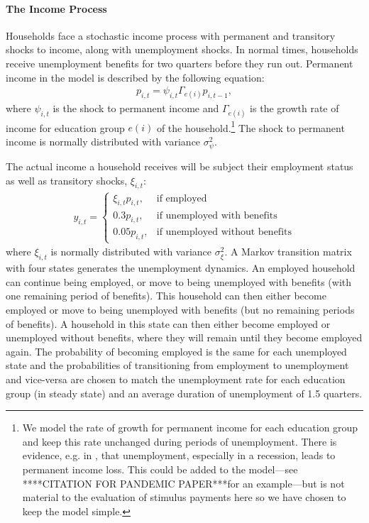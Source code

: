 \documentclass[../HAFiscal]{subfiles}
\begin{document}
\paragraph{The Income Process}
Households face a stochastic income process with permanent and transitory shocks to income, along with unemployment shocks. In normal times, households receive unemployment benefits for two quarters before they run out. Permanent income in the model is described by the following equation:
\begin{align}
p_{i,t} = \psi_{i,t}\Gamma_{e(i)}p_{i,t-1},
\end{align}
where $\psi_{i,t}$ is the shock to permanent income and $\Gamma_{e(i)}$ is the growth rate of income for education group $e(i)$ of the household.\footnote{We model the rate of growth for permanent income for each education group and keep this rate unchanged during periods of unemployment. There is evidence, e.g. in \cite{davis_recessions_2011}, that unemployment, especially in a recession, leads to permanent income loss. This could be added to the model---see ****CITATION FOR PANDEMIC PAPER***for an example---but is not material to the evaluation of stimulus payments here so we have chosen to keep the model simple.  } The shock to permanent income is normally distributed with variance $\sigma_{\psi}^2$.
	
	The actual income a household receives will be subject their employment status as well as transitory shocks, $\xi_{i,t}$:
	\begin{align}
		y_{i,t} =   \begin{cases}
						\xi_{i,t}p_{i,t}, & \text{if employed} \\
						0.3 p_{i,t}, & \text{if unemployed with benefits} \\
						0.05 p_{i,t}, & \text{if unemployed without benefits} 
					\end{cases}
	\end{align}
	where $\xi_{i,t}$ is normally distributed with variance $\sigma_{\xi}^2$. A Markov transition matrix with four states generates the unemployment dynamics. An employed household can continue being employed, or move to being unemployed with benefits (with one remaining period of benefits). This household can then either become employed or move to being unemployed with benefits (but no remaining periods of benefits). A household in this state can then either become employed or unemployed without benefits, where they will remain until they become employed again. The probability of becoming employed is the same for each unemployed state and the probabilities of transitioning from employment to unemployment and vice-versa are chosen to match the unemployment rate for each education group (in steady state) and an average duration of unemployment of 1.5 quarters.
	
\end{document}

